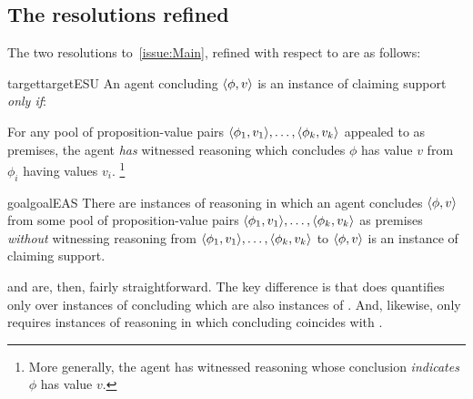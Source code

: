 \subsection{The resolutions refined}
\label{sec:two-resolutions}

\begin{note}
  The two resolutions to~\autoref{issue:Main}, refined with respect to  are as follows:
\end{note}

\begin{note}
  \begin{restatable}{target}{targetESU}
    \label{denied-claim}
    An agent concluding \(\langle \phi, v \rangle\) is an instance of claiming support \emph{only if}:

    For any pool of proposition-value pairs \(\langle \phi_{1}, v_{1} \rangle,\dots,\langle \phi_{k}, v_{k} \rangle\) appealed to as premises, the agent \emph{has} witnessed reasoning which concludes \(\phi\) has value \(v\) from \(\phi_{i}\) having values \(v_{i}\).\nolinebreak
    \footnote{More generally, the agent has witnessed reasoning whose conclusion \emph{indicates} \(\phi\) has value \(v\).}
  \end{restatable}
\end{note}

\begin{note}
  \begin{restatable}{goal}{goalEAS}
    \label{prop:EAS}
    There are instances of reasoning in which an agent concludes \(\langle \phi, v \rangle\) from some pool of proposition-value pairs \(\langle \phi_{1}, v_{1} \rangle,\dots,\langle \phi_{k}, v_{k} \rangle\) as premises \emph{without} witnessing reasoning from \(\langle \phi_{1}, v_{1} \rangle,\dots,\langle \phi_{k}, v_{k} \rangle\) to \(\langle \phi, v \rangle\) is an instance of claiming support.
  \end{restatable}
\end{note}

\begin{note}
  \ESU{} and \EAS{} are, then, fairly straightforward.
  The key difference is that \ESU{} does quantifies only over instances of concluding which are also instances of .
  And, likewise, \EAS{} only requires instances of reasoning in which concluding coincides with .
\end{note}

